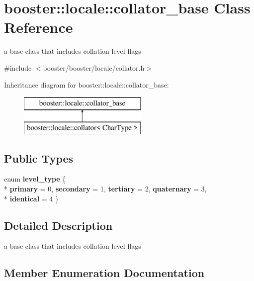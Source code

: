 \section{booster\-:\-:locale\-:\-:collator\-\_\-base Class Reference}
\label{classbooster_1_1locale_1_1collator__base}


a base class that includes collation level flags  




{\ttfamily \#include $<$booster/booster/locale/collator.\-h$>$}

Inheritance diagram for booster\-:\-:locale\-:\-:collator\-\_\-base\-:\begin{figure}[H]
\begin{center}
\leavevmode
\includegraphics[height=2.000000cm]{classbooster_1_1locale_1_1collator__base}
\end{center}
\end{figure}
\subsection*{Public Types}
\begin{DoxyCompactItemize}
\item 
enum {\bf level\-\_\-type} \{ \\*
{\bf primary} = 0, 
{\bf secondary} = 1, 
{\bf tertiary} = 2, 
{\bf quaternary} = 3, 
\\*
{\bf identical} = 4
 \}
\end{DoxyCompactItemize}


\subsection{Detailed Description}
a base class that includes collation level flags 

\subsection{Member Enumeration Documentation}
